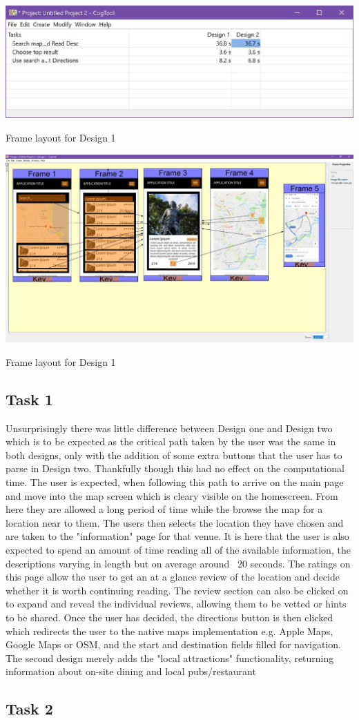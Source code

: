 \documentclass{article}
\begin{document}
\begin{table}[H]
\hspace{-2.5cm}
\includegraphics{images/cogtoolresults.jpg}
	\caption{Frame layout for Design 1}
\end{table}
\begin{table}[H]
\hspace{-2.5cm}
\includegraphics{images/cogtoolframes.jpg}
	\caption{Frame layout for Design 1}
\end{table}

\subsection{Task 1}
Unsurprisingly there was little difference between Design one and Design two which is to be expected as the critical path taken by the user was the same in both designs, only with the addition of some extra buttons that the user has to parse in Design two.
Thankfully though this had no effect on the computational time.
The user is expected, when following this path to arrive on the main page and move into the map screen which is cleary visible on the homescreen.
From here they are allowed a long period of time while the browse the map for a location near to them.
The users then selects the location they have chosen and are taken to the "information" page for that venue.
It is here that the user is also expected to spend an amount of time reading all of the available information, the descriptions varying in length but on average around ~20 seconds.
The ratings on this page allow the user to get an at a glance review of the location and decide whether it is worth continuing reading.
The review section can also be clicked on to expand and reveal the individual reviews, allowing them to be vetted or hints to be shared.
Once the user has decided, the directions button is then clicked which redirects the user to the native maps implementation e.g. Apple Maps, Google Maps or OSM, and the start and destination fields filled for navigation.
The second design merely adds the "local attractions" functionality, returning information about on-site dining and local pubs/restaurant
\subsection{Task 2}
\end{document}
